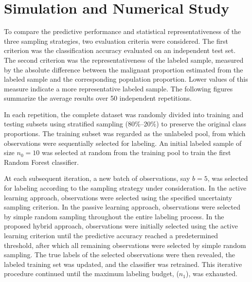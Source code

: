 \documentclass[twoside]{article}
\begin{document}

\section{Simulation and Numerical Study}

To compare the predictive performance and statistical representativeness of the
three sampling strategies, two evaluation criteria were considered. The first
criterion was the classification accuracy evaluated on an independent test set.
The second criterion was the representativeness of the labeled sample, measured
by the absolute difference between the malignant proportion estimated from the
labeled sample and the corresponding population proportion. Lower values of this
measure indicate a more representative labeled sample. The following figures
summarize the average results over 50 independent repetitions.


In each repetition, the complete dataset was randomly divided into training and testing subsets using stratified sampling (80\%--20\%) to preserve the original class proportions. The training subset was regarded as the unlabeled pool, from which observations were sequentially selected for labeling. An initial labeled sample of size $n_0=10$ was selected at random from the training pool to train the first Random Forest classifier.

At each subsequent iteration, a new batch of observations, say $b=5$, was selected for labeling according to the sampling strategy under consideration. In the active learning approach, observations were selected using the specified uncertainty sampling criterion. In the passive learning approach, observations were selected by simple random sampling throughout the entire labeling process. In the proposed hybrid approach, observations were initially selected using the active learning criterion until the predictive accuracy reached a predetermined threshold, after which all remaining observations were selected by simple random sampling. The true labels of the selected observations were then revealed, the labeled training set was updated, and the classifier was retrained. This iterative procedure continued until the maximum labeling budget, ($n_1$), was exhausted.
\end{document}
